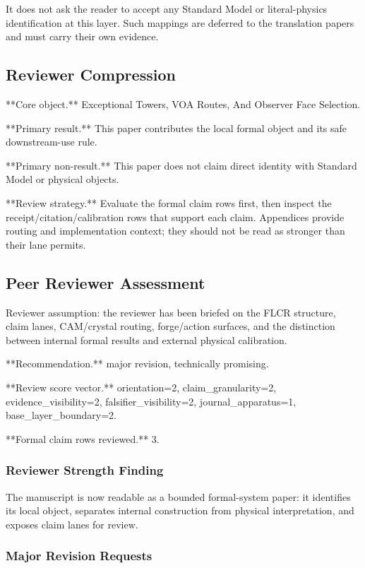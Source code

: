 \documentclass[11pt]{article}
\begin{document}
It does not ask the reader to accept any Standard Model or literal-physics identification at this layer. Such mappings are deferred to the translation papers and must carry their own evidence.

\subsection*{Reviewer Compression}

**Core object.** Exceptional Towers, VOA Routes, And Observer Face Selection.

**Primary result.** This paper contributes the local formal object and its safe downstream-use rule.

**Primary non-result.** This paper does not claim direct identity with Standard Model or physical objects.

**Review strategy.** Evaluate the formal claim rows first, then inspect the receipt/citation/calibration rows that support each claim. Appendices provide routing and implementation context; they should not be read as stronger than their lane permits.

\subsection*{Peer Reviewer Assessment}

Reviewer assumption: the reviewer has been briefed on the FLCR structure, claim lanes, CAM/crystal routing, forge/action surfaces, and the distinction between internal formal results and external physical calibration.

**Recommendation.** major revision, technically promising.

**Review score vector.** orientation=2, claim\_granularity=2, evidence\_visibility=2, falsifier\_visibility=2, journal\_apparatus=1, base\_layer\_boundary=2.

**Formal claim rows reviewed.** 3.

\subsubsection*{Reviewer Strength Finding}

The manuscript is now readable as a bounded formal-system paper: it identifies its local object, separates internal construction from physical interpretation, and exposes claim lanes for review.

\subsubsection*{Major Revision Requests}
\end{document}
